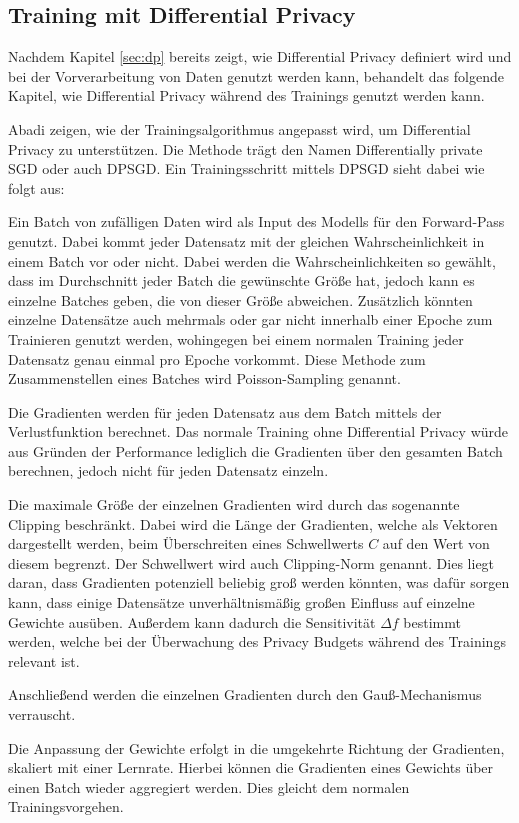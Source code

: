 \subsection{Training mit Differential Privacy}\label{sec:dp_training}

Nachdem Kapitel \ref{sec:dp} bereits zeigt, wie Differential Privacy definiert wird und bei der Vorverarbeitung von Daten genutzt werden kann, behandelt das folgende Kapitel, wie Differential Privacy während des Trainings genutzt werden kann.

Abadi \etal \cite{P-28} zeigen, wie der Trainingsalgorithmus angepasst wird, um Differential Privacy zu unterstützen.
Die Methode trägt den Namen Differentially private SGD oder auch DPSGD.
Ein Trainingsschritt mittels DPSGD sieht dabei wie folgt aus:
\begin{compactenum}
    \item Ein Batch von zufälligen Daten wird als Input des Modells für den Forward-Pass genutzt. Dabei kommt jeder Datensatz mit der gleichen Wahrscheinlichkeit in einem Batch vor oder nicht. 
    Dabei werden die Wahrscheinlichkeiten so gewählt, dass im Durchschnitt jeder Batch die gewünschte Größe hat, jedoch kann es einzelne Batches geben, die von dieser Größe abweichen.
    Zusätzlich könnten einzelne Datensätze auch mehrmals oder gar nicht innerhalb einer Epoche zum Trainieren genutzt werden, wohingegen bei einem normalen Training jeder Datensatz genau einmal pro Epoche vorkommt.
    Diese Methode zum Zusammenstellen eines Batches wird Poisson-Sampling genannt.
    \item Die Gradienten werden für jeden Datensatz aus dem Batch mittels der Verlustfunktion berechnet. Das normale Training ohne Differential Privacy würde aus Gründen der Performance lediglich die Gradienten über den gesamten Batch berechnen, jedoch nicht für jeden Datensatz einzeln.
    \item Die maximale Größe der einzelnen Gradienten wird durch das sogenannte Clipping beschränkt. Dabei wird die Länge der Gradienten, welche als Vektoren dargestellt werden, beim Überschreiten eines Schwellwerts $C$ auf den Wert von diesem begrenzt. 
    Der Schwellwert wird auch Clipping-Norm genannt.
    Dies liegt daran, dass Gradienten potenziell beliebig groß werden könnten, was dafür sorgen kann, dass einige Datensätze unverhältnismäßig großen Einfluss auf einzelne Gewichte ausüben. Außerdem kann dadurch die Sensitivität $\Delta f$ bestimmt werden, welche bei der Überwachung des Privacy Budgets während des Trainings relevant ist.
    \item Anschließend werden die einzelnen Gradienten durch den Gauß-Mechanismus verrauscht. 
    \item Die Anpassung der Gewichte erfolgt in die umgekehrte Richtung der Gradienten, skaliert mit einer Lernrate. Hierbei können die Gradienten eines Gewichts über einen Batch wieder aggregiert werden. Dies gleicht dem normalen Trainingsvorgehen.
\end{compactenum}


